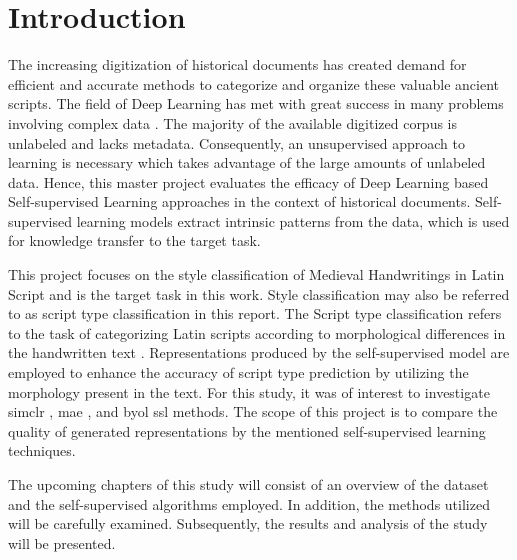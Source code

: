 \chapter{Introduction}

The increasing digitization of historical documents has created demand for efficient and accurate methods to categorize and organize these valuable ancient scripts. The field of Deep Learning has met with great success in many problems involving complex data \cite{najafabadi_deep_2015}. The majority of the available digitized corpus is unlabeled and lacks metadata. Consequently, an unsupervised approach to learning is necessary which takes advantage of the large amounts of unlabeled data. Hence, this master project evaluates the efficacy of Deep Learning based Self-supervised Learning approaches in the context of historical documents. Self-supervised learning models extract intrinsic patterns from the data, which is used for knowledge transfer to the target task.

This project focuses on the style classification of Medieval Handwritings in Latin Script and is the target task in this work. Style classification may also be referred to as script type classification in this report. The Script type classification refers to the task of categorizing Latin scripts according to morphological differences in the handwritten text \cite{cloppet_icdar2017_2017}. Representations produced by the self-supervised model are employed to enhance the accuracy of script type prediction by utilizing the morphology present in the text. For this study, it was of interest to investigate \acrfull{simclr} \cite{chen_simple_2020}, \acrfull{mae} \cite{he_masked_2021}, and \acrfull{byol} \cite{grill_bootstrap_2020} \acrfull{ssl} methods. The scope of this project is to compare the quality of generated representations by the mentioned self-supervised learning techniques.

The upcoming chapters of this study will consist of an overview of the dataset and the self-supervised algorithms employed. In addition, the methods utilized will be carefully examined. Subsequently, the results and analysis of the study will be presented.




